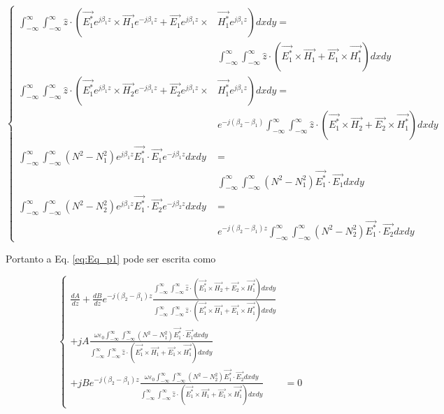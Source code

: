 \documentclass[11pt]{article} %
\newcommand{\epsz}{\varepsilon_0}
\begin{document}
\begin{equation*}
\left\{
\begin{split}
\int_{-\infty}^\infty\int_{-\infty}^\infty \hat{z}\cdot\left( \vec{E_1^*}e^{j\beta_1z}\times\vec{H_1}e^{-j\beta_1z} + \vec{E_1}e^{j\beta_1z}\times\right.&\left.\vec{H_1^*}e^{j\beta_1z} \right) dxdy = \\
&\int_{-\infty}^\infty\int_{-\infty}^\infty \hat{z}\cdot\left( \vec{E_1^*}\times\vec{H_1} + \vec{E_1}\times\vec{H_1^*} \right) dxdy \\
\int_{-\infty}^\infty\int_{-\infty}^\infty \hat{z}\cdot\left( \vec{E_1^*}e^{j\beta_1z}\times\vec{H_2}e^{-j\beta_1z} + \vec{E_2}e^{j\beta_1z}\times\right.&\left.\vec{H_1^*}e^{j\beta_1z} \right) dxdy = \\
&e^{-j(\beta_2-\beta_1)}\int_{-\infty}^\infty\int_{-\infty}^\infty \hat{z}\cdot\left( \vec{E_1^*}\times\vec{H_2} + \vec{E_2}\times\vec{H_1^*} \right) dxdy \\
\int_{-\infty}^\infty\int_{-\infty}^\infty \left(N^2-N_1^2\right)e^{j\beta_1z}\vec{E_1^*}\cdot\vec{E_1}e^{-j\beta_1z} dxdy& = \\
&\int_{-\infty}^\infty\int_{-\infty}^\infty \left(N^2-N_1^2\right)\vec{E_1^*}\cdot\vec{E_1} dxdy \\
\int_{-\infty}^\infty\int_{-\infty}^\infty \left(N^2-N_2^2\right)e^{j\beta_1z}\vec{E_1^*}\cdot\vec{E_2}e^{-j\beta_2z} dxdy& = \\
&e^{-j(\beta_2-\beta_1)z}\int_{-\infty}^\infty\int_{-\infty}^\infty \left(N^2-N_2^2\right)\vec{E_1^*}\cdot\vec{E_2} dxdy
\end{split}
\right.
\end{equation*}

Portanto a Eq. \ref{eq:Eq_p1} pode ser escrita como

\begin{equation} \label{eq:z_sep_Eq_p1}
\left\{
\begin{split}
\frac{dA}{dz} + \frac{dB}{dz}e^{-j(\beta_2-\beta_1)z}\frac{\int_{-\infty}^\infty\int_{-\infty}^\infty \hat{z}\cdot\left( \vec{E_1^*}\times\vec{H_2} + \vec{E_2}\times\vec{H_1^*} \right) dxdy}{\int_{-\infty}^\infty\int_{-\infty}^\infty \hat{z}\cdot\left( \vec{E_1^*}\times\vec{H_1} + \vec{E_1}\times\vec{H_1^*} \right) dxdy} &\\
+ jA \frac{\omega\epsz  \int_{-\infty}^\infty\int_{-\infty}^\infty \left(N^2-N_1^2\right)\vec{E_1^*}\cdot\vec{E_1} dxdy}{\int_{-\infty}^\infty\int_{-\infty}^\infty \hat{z}\cdot\left( \vec{E_1^*}\times\vec{H_1} + \vec{E_1}\times\vec{H_1^*} \right) dxdy} &\\
+ jBe^{-j(\beta_2-\beta_1)z} \frac{\omega\epsz  \int_{-\infty}^\infty\int_{-\infty}^\infty \left(N^2-N_2^2\right)\vec{E_1^*}\cdot\vec{E_2} dxdy}{\int_{-\infty}^\infty\int_{-\infty}^\infty \hat{z}\cdot\left( \vec{E_1^*}\times\vec{H_1} + \vec{E_1}\times\vec{H_1^*} \right) dxdy} &= 0
\end{split}
\right.
\end{equation}
\end{document}
